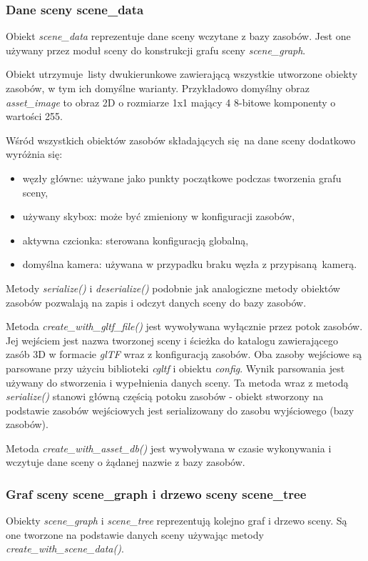 \subsubsection{Dane sceny scene\_data}
Obiekt \textit{scene\_data} reprezentuje dane sceny wczytane z bazy zasobów. Jest one używany przez moduł sceny do konstrukcji grafu sceny \textit{scene\_graph}.

Obiekt utrzymuje listy dwukierunkowe zawierającą wszystkie utworzone obiekty zasobów, w tym ich domyślne warianty.
Przykładowo domyślny obraz \textit{asset\_image} to obraz 2D o rozmiarze 1x1 mający 4 8-bitowe komponenty o wartości 255.

Wśród wszystkich obiektów zasobów składających się na dane sceny dodatkowo wyróżnia się:
\begin{itemize}
	\item węzły główne: używane jako punkty początkowe podczas tworzenia grafu sceny,
	\item używany skybox: może być zmieniony w konfiguracji zasobów,
	\item aktywna czcionka: sterowana konfiguracją globalną,
	\item domyślna kamera: używana w przypadku braku węzła z przypisaną kamerą.
\end{itemize}

Metody \textit{serialize()} i \textit{deserialize()} podobnie jak analogiczne metody obiektów zasobów pozwalają na zapis i odczyt danych sceny do bazy zasobów.

Metoda \textit{create\_with\_gltf\_file()} jest wywoływana wyłącznie przez potok zasobów.
Jej wejściem jest nazwa tworzonej sceny i ścieżka do katalogu zawierającego zasób 3D w formacie \textit{glTF} wraz z konfiguracją zasobów.
Oba zasoby wejściowe są parsowane przy użyciu biblioteki \textit{cgltf} i obiektu \textit{config}.
Wynik parsowania jest używany do stworzenia i wypełnienia danych sceny.
Ta metoda wraz z metodą \textit{serialize()} stanowi główną częścią potoku zasobów - obiekt stworzony na podstawie zasobów wejściowych jest serializowany do zasobu wyjściowego (bazy zasobów).

Metoda \textit{create\_with\_asset\_db()} jest wywoływana w czasie wykonywania i wczytuje dane sceny o żądanej nazwie z bazy zasobów.

\subsubsection{Graf sceny scene\_graph i drzewo sceny scene\_tree}
Obiekty \textit{scene\_graph} i \textit{scene\_tree} reprezentują kolejno graf i drzewo sceny.
Są one tworzone na podstawie danych sceny używając metody \textit{create\_with\_scene\_data()}.

